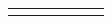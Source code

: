 \begin{table}[htb]
\caption{\label{tab}
 }
\begin{center}
\begin{tabular}{|l||c|c|c|c||c|}
\hline
  &   &   &   &   &  \\
\hline \hline
\cline{1-5}
  &   &   &   &   &  \\
\hline
\end{tabular}
\end{center}
\end{table}
